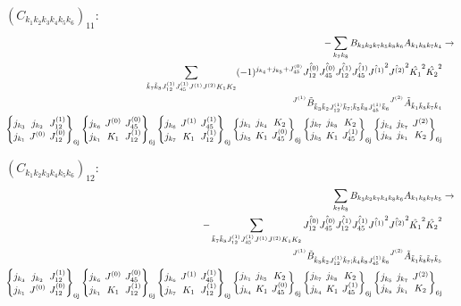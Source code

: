\documentclass[11pt]{article}
\newcommand{\sixj}[6]{\begingroup\setlength{\arraycolsep}{0.2em}\begin{Bmatrix} #1 & #2 & #3 \\ #4 & #5 & #6 \end{Bmatrix}_{\text{6j}}\endgroup}
\begin{document}
$\left({C}_{{k}_{1}{k}_{2}{k}_{3}{k}_{4}{k}_{5}{k}_{6}}\right)_{11}$:
\begin{align}
-\sum_{{k}_{7}{k}_{8}}{B}_{{k}_{3}{k}_{2}{k}_{7}{k}_{5}{k}_{8}{k}_{6}}{A}_{{k}_{1}{k}_{8}{k}_{7}{k}_{4}}&\rightarrow \notag \\\sum_{\tilde{k}_{7}\tilde{k}_{8}J^{(1)}_{12}J^{(1)}_{45}J^{(1)}J^{(2)}K_{1}K_{2}}(-1)^{j_{{k}_{4}} +j_{{k}_{5}} +J^{(0)}_{45} }\hat{J^{(0)}_{12}}\hat{J^{(0)}_{45}}\hat{J^{(1)}_{12}}\hat{J^{(1)}_{45}}\hat{J^{(1)}}^{2}\hat{J^{(2)}}^{2}\hat{K_{1}}^{2}\hat{K_{2}}^{2}& \notag \\{}^{J^{(1)}}\tilde{B}_{\tilde{k}_{3}\tilde{k}_{2}J^{(1)}_{12}\tilde{k}_{7};\tilde{k}_{5}\tilde{k}_{8}J^{(1)}_{45}\tilde{k}_{6}}{}^{J^{(2)}}\tilde{A}_{\tilde{k}_{1}\tilde{k}_{8}\tilde{k}_{7}\tilde{k}_{4}}& \notag \\\sixj{j_{{k}_{3}}}{j_{{k}_{2}}}{J^{(1)}_{12}}{j_{{k}_{1}}}{J^{(0)}}{J^{(0)}_{12}}\sixj{j_{{k}_{6}}}{J^{(0)}}{J^{(0)}_{45}}{j_{{k}_{1}}}{K_{1}}{J^{(1)}_{12}}\sixj{j_{{k}_{6}}}{J^{(1)}}{J^{(1)}_{45}}{j_{{k}_{7}}}{K_{1}}{J^{(1)}_{12}}\sixj{j_{{k}_{1}}}{j_{{k}_{4}}}{K_{2}}{j_{{k}_{5}}}{K_{1}}{J^{(0)}_{45}}\sixj{j_{{k}_{7}}}{j_{{k}_{8}}}{K_{2}}{j_{{k}_{5}}}{K_{1}}{J^{(1)}_{45}}\sixj{j_{{k}_{4}}}{j_{{k}_{7}}}{J^{(2)}}{j_{{k}_{8}}}{j_{{k}_{1}}}{K_{2}}
\end{align}

$\left({C}_{{k}_{1}{k}_{2}{k}_{3}{k}_{4}{k}_{5}{k}_{6}}\right)_{12}$:
\begin{align}
\sum_{{k}_{7}{k}_{8}}{B}_{{k}_{3}{k}_{2}{k}_{7}{k}_{4}{k}_{8}{k}_{6}}{A}_{{k}_{1}{k}_{8}{k}_{7}{k}_{5}}&\rightarrow \notag \\-\sum_{\tilde{k}_{7}\tilde{k}_{8}J^{(1)}_{12}J^{(1)}_{45}J^{(1)}J^{(2)}K_{1}K_{2}}\hat{J^{(0)}_{12}}\hat{J^{(0)}_{45}}\hat{J^{(1)}_{12}}\hat{J^{(1)}_{45}}\hat{J^{(1)}}^{2}\hat{J^{(2)}}^{2}\hat{K_{1}}^{2}\hat{K_{2}}^{2}& \notag \\{}^{J^{(1)}}\tilde{B}_{\tilde{k}_{3}\tilde{k}_{2}J^{(1)}_{12}\tilde{k}_{7};\tilde{k}_{4}\tilde{k}_{8}J^{(1)}_{45}\tilde{k}_{6}}{}^{J^{(2)}}\tilde{A}_{\tilde{k}_{1}\tilde{k}_{8}\tilde{k}_{7}\tilde{k}_{5}}& \notag \\\sixj{j_{{k}_{3}}}{j_{{k}_{2}}}{J^{(1)}_{12}}{j_{{k}_{1}}}{J^{(0)}}{J^{(0)}_{12}}\sixj{j_{{k}_{6}}}{J^{(0)}}{J^{(0)}_{45}}{j_{{k}_{1}}}{K_{1}}{J^{(1)}_{12}}\sixj{j_{{k}_{6}}}{J^{(1)}}{J^{(1)}_{45}}{j_{{k}_{7}}}{K_{1}}{J^{(1)}_{12}}\sixj{j_{{k}_{1}}}{j_{{k}_{5}}}{K_{2}}{j_{{k}_{4}}}{K_{1}}{J^{(0)}_{45}}\sixj{j_{{k}_{7}}}{j_{{k}_{8}}}{K_{2}}{j_{{k}_{4}}}{K_{1}}{J^{(1)}_{45}}\sixj{j_{{k}_{5}}}{j_{{k}_{7}}}{J^{(2)}}{j_{{k}_{8}}}{j_{{k}_{1}}}{K_{2}}
\end{align}
\end{document}
